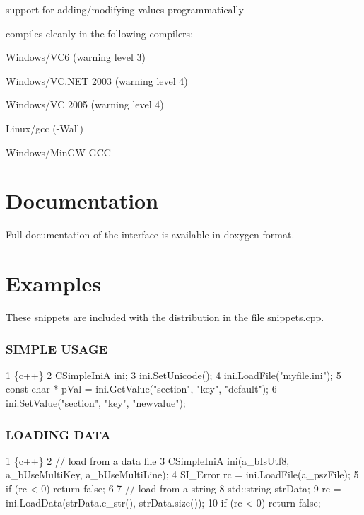 \begin{DoxyItemize}
\item support for adding/modifying values programmatically
\item compiles cleanly in the following compilers\+:
\begin{DoxyItemize}
\item Windows/\+V\+C6 (warning level 3)
\item Windows/\+V\+C.\+N\+E\+T 2003 (warning level 4)
\item Windows/\+V\+C 2005 (warning level 4)
\item Linux/gcc (-\/\+Wall)
\item Windows/\+Min\+G\+W G\+C\+C
\end{DoxyItemize}
\end{DoxyItemize}

\section*{Documentation}

Full documentation of the interface is available in doxygen format.

\section*{Examples}

These snippets are included with the distribution in the file snippets.\+cpp.

\subsubsection*{S\+I\+M\+P\+L\+E U\+S\+A\+G\+E}


\begin{DoxyCode}
1 \{c++\}
2 CSimpleIniA ini;
3 ini.SetUnicode();
4 ini.LoadFile("myfile.ini");
5 const char * pVal = ini.GetValue("section", "key", "default");
6 ini.SetValue("section", "key", "newvalue");
\end{DoxyCode}


\subsubsection*{L\+O\+A\+D\+I\+N\+G D\+A\+T\+A}


\begin{DoxyCode}
1 \{c++\}
2 // load from a data file
3 CSimpleIniA ini(a\_bIsUtf8, a\_bUseMultiKey, a\_bUseMultiLine);
4 SI\_Error rc = ini.LoadFile(a\_pszFile);
5 if (rc < 0) return false;
6 
7 // load from a string
8 std::string strData;
9 rc = ini.LoadData(strData.c\_str(), strData.size());
10 if (rc < 0) return false;
\end{DoxyCode}


